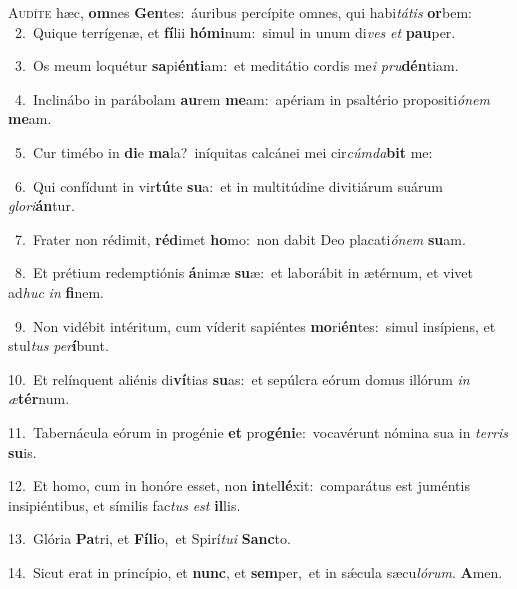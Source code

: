 \lettrine{\initial\textcolor{\initialcolor}{A}}{udíte} hæc, \textbf{om}\-nes \textbf{Gen}\-tes:~\star áuribus percípite omnes, qui habi\-\textit{tá}\-\textit{tis} \textbf{or}\-bem:\\
{\numbfont\textcolor{\numbcolor}{~2.}}~Quique terrígenæ, et \textbf{fí}\-lii \textbf{hó}\-\textbf{mi}num:~\star simul in unum di\textit{ves} \textit{et} \textbf{pau}\-per.\par
{\numbfont\textcolor{\numbcolor}{~3.}}~Os meum loquétur \textbf{sa}\-pi\-\textbf{én}\-\textbf{ti}am:~\star et meditátio cordis me\textit{i} \textit{pru}\-\textbf{dén}tiam.\par
{\numbfont\textcolor{\numbcolor}{~4.}}~Inclinábo in parábolam \textbf{au}\-rem \textbf{me}\-am:~\star apériam in psaltério propositi\-\textit{ó}\-\textit{nem} \textbf{me}\-am.\par
{\numbfont\textcolor{\numbcolor}{~5.}}~Cur timébo in \textbf{di}\-e \textbf{ma}\-la?~\star iníquitas calcánei mei cir\-\textit{cúm}\-\textit{da}\textbf{bit} me:\par
{\numbfont\textcolor{\numbcolor}{~6.}}~Qui confídunt in vir\-\textbf{tú}\-te \textbf{su}\-a:~\star et in multitúdine divitiárum suárum \textit{glo}\-\textit{ri}\textbf{án}tur.\par
{\numbfont\textcolor{\numbcolor}{~7.}}~Frater non rédimit, \textbf{réd}\-imet \textbf{ho}\-mo:~\star non dabit Deo placati\-\textit{ó}\-\textit{nem} \textbf{su}\-am.\par
{\numbfont\textcolor{\numbcolor}{~8.}}~Et prétium redemptiónis \textbf{á}\-nimæ \textbf{su}\-æ:~\star et laborábit in ætérnum, et vivet ad\textit{huc} \textit{in} \textbf{fi}\-nem.\par
{\numbfont\textcolor{\numbcolor}{~9.}}~Non vidébit intéritum, cum víderit sapiéntes \textbf{mo}\-ri\-\textbf{én}\-tes:~\star simul insípiens, et stul\textit{tus} \textit{per}\-\textbf{í}bunt.\par
{\numbfont\textcolor{\numbcolor}{10.}}~Et relínquent aliénis di\-\textbf{ví}\-tias \textbf{su}\-as:~\star et sepúlcra eórum domus illórum \textit{in} \textit{æ}\-\textbf{tér}num.\par
{\numbfont\textcolor{\numbcolor}{11.}}~Tabernácula eórum in progénie \textbf{et} pro\-\textbf{gé}\-\textbf{ni}e:~\star vocavérunt nómina sua in \textit{ter}\-\textit{ris} \textbf{su}\-is.\par
{\numbfont\textcolor{\numbcolor}{12.}}~Et homo, cum in honóre esset, non \textbf{in}\-tel\-\textbf{lé}\-xit:~\star comparátus est juméntis insipiéntibus, et símilis fac\textit{tus} \textit{est} \textbf{il}\-lis.\par
{\numbfont\textcolor{\numbcolor}{13.}}~Glória \textbf{Pa}\-tri, et \textbf{Fí}\-\textbf{li}o,~\star et Spirí\-\textit{tu}\-\textit{i} \textbf{Sanc}\-to.\par
{\numbfont\textcolor{\numbcolor}{14.}}~Sicut erat in princípio, et \textbf{nunc}\-, et \textbf{sem}\-per,~\star et in sǽcula sæcu\-\textit{ló}\-\textit{rum}. \textbf{A}\-men.\par
